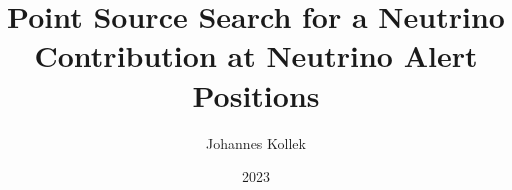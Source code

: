\documentclass[
  tucolor,       %
  BCOR=12mm,     %
  parskip=half,  %
  open=any,      %
  cleardoublepage=plain,  %
]{tudothesis}
\author{Johannes Kollek}
\title{Point Source Search for a Neutrino Contribution at Neutrino Alert Positions}
\date{2023}
\begin{document}
\frontmatter
%
\maketitle

\makecorrectorpage


\tableofcontents

\mainmatter










%
%
%

\appendix


\backmatter
\printbibliography

\cleardoublepage

\end{document}
